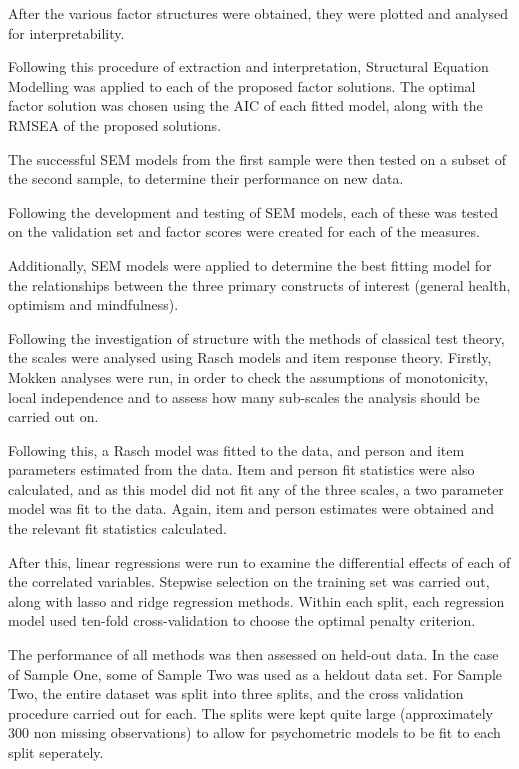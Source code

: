\documentclass{article}
\begin{document}
After the various factor structures were obtained, they were plotted and analysed for interpretability. %

Following this procedure of extraction and interpretation, Structural Equation Modelling was applied to each of the proposed factor solutions. The optimal factor solution was chosen using the AIC of each fitted model, along with the RMSEA of the proposed solutions.

The successful SEM models from the first sample were then tested on a subset of the second sample, to determine their performance on new data. 

Following the development and testing of SEM models, each of these was tested on the validation set and factor scores were created for each of the measures.

Additionally, SEM models were applied to determine the best fitting model for the relationships between the three primary constructs of interest (general health, optimism and mindfulness). 

Following the investigation of structure with the methods of classical test theory, the scales were analysed using Rasch models and item response theory. Firstly, Mokken analyses  were run, in order to check the assumptions of monotonicity, local independence and to assess how many sub-scales the analysis should be carried out on. 

Following this, a Rasch model was fitted to the data, and person and item parameters estimated from the data. Item and person fit statistics were also calculated, and as this model did not fit any of the three scales, a two parameter model was fit to the data. Again, item and person estimates were obtained and the relevant fit statistics calculated. 


After this, linear regressions were run to examine the differential effects of each of the correlated variables. Stepwise selection on the training set was carried out, along with lasso and ridge regression  methods. Within each split, each regression model used ten-fold cross-validation to choose the optimal penalty criterion. 

The performance of all methods was then assessed on held-out data. In the case of Sample One, some of Sample Two was used as a heldout data set. For Sample Two, the entire dataset was split into three splits, and the cross validation procedure carried out for each. The splits were kept quite large (approximately 300 non missing observations) to allow for psychometric models to be fit to each split seperately. %
\end{document}
